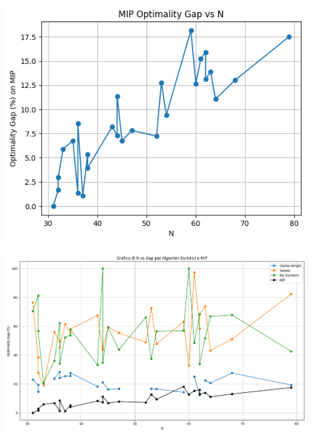 \documentclass[compress]{beamer}
\begin{document}
\begin{frame}{\subsecname}
    \begin{center}
		\begin{minipage}{1\textwidth}
            \centering
            \includegraphics[width=0.75\linewidth]{images/MIP.png}
        \end{minipage}
    \end{center}
\end{frame}

\begin{frame}{\subsecname}
    \begin{center}
		\begin{minipage}{1\textwidth}
            \centering
            \includegraphics[width=1\linewidth]{images/N_gap.png}
        \end{minipage}
    \end{center}
\end{frame}
\end{document}
